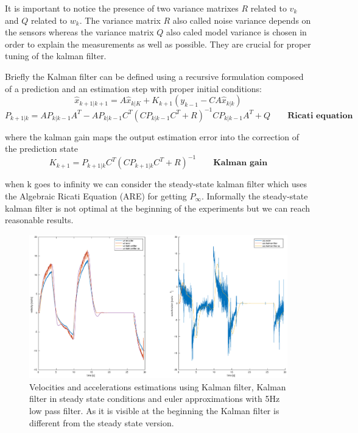 \documentclass[a4paper,12pt]{article}
\begin{document}
It is important to notice the presence of two variance matrixes $R$ related to $v_k$ and $Q$ related to $w_k$. The variance matrix $R$ also called noise variance depends on the sensors whereas the variance
matrix $Q$ also caled model variance is chosen in order to explain the measurements as well as
possible. They are crucial for proper tuning of the kalman filter.

\bigskip
\noindent Briefly the Kalman filter can be defined using a recursive formulation composed of a prediction and an estimation step with proper initial conditions:
\[
    \hat{x}_{k+1|k+1} = A\hat{x}_{k|K} + K_{k+1}(y_{k-1} - CA\hat{x}_{k|k})
\]   
\[
    P_{k+1|k} = AP_{k|k-1}A^T - AP_{k|k-1}C^T(CP_{k|k-1}C^T + R)^{-1}CP_{k|k-1}A^T+Q \qquad \textbf{Ricati equation}
\]

\bigskip
where the kalman gain maps the output estimation error into the correction of the prediction state
\[
    K_{k+1} = P_{k+1|k}C^T(CP_{k+1|k}C^T+R)^{-1} \qquad \textbf{Kalman gain}
\]

when k goes to infinity we can consider the steady-state kalman filter which uses the Algebraic Ricati Equation (ARE) for getting $P_{\infty}$. Informally the steady-state kalman filter is not optimal at the beginning of the experiments but we can reach reasonable results.

\begin{figure}[H]
    \begin{center}
        \hspace*{-4.6cm}
        \includegraphics[scale=0.5]{images/kalman_filter.eps}
    \end{center}
    \caption{Velocities and accelerations estimations using Kalman filter, Kalman filter in steady state conditions and euler approximations with 5Hz low pass filter. As it is visible at the beginning the Kalman filter is different from the steady state version.}
    \label{fig:kalman_filter}
\end{figure}
\end{document}
